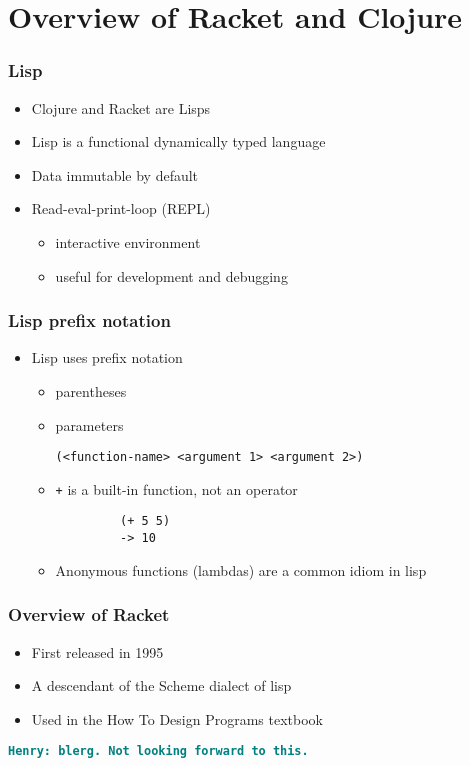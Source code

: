 \documentclass{beamer}
\newcommand{\comment}[1]{{\bf \tt  {#1}}}
\newcommand{\hfcomment}[1]{\textcolor{Teal}{\comment{Henry: {#1}}}}
\begin{document}
\section{Overview of Racket and Clojure}

\begin{frame}
\frametitle{Lisp}
	\begin{itemize}
		\item Clojure and Racket are Lisps
		\item Lisp is a functional dynamically typed language
		\item Data immutable by default
  			\item Read-eval-print-loop (REPL)
  	 		\begin{itemize}
  	 		\item interactive environment
  	 		\item useful for development and debugging
  	 	\end{itemize}
	\end{itemize}
\end{frame}

\begin{frame}[fragile]
\frametitle{Lisp prefix notation}
	\begin{itemize}
  	  \item Lisp uses prefix notation
  	  \begin{itemize}
  	 	 \item parentheses
  	 	 \item parameters
  	 	 
  	 	 \texttt{(<function-name> <argument 1> <argument 2>)}
  	 	 \item \texttt{+} is a built-in function, not an operator
  	 	 \begin{verbatim}		
		 (+ 5 5)
		 -> 10
	     \end{verbatim}
		\item Anonymous functions (lambdas) are a common idiom in lisp
		
	  \end{itemize}
   \end{itemize}
\end{frame}

\begin{frame}
\frametitle{Overview of Racket}
	\begin{itemize}
		\item First released in 1995
		\item A descendant of the Scheme dialect of lisp
		\item Used in the How To Design Programs textbook
	\end{itemize}
\hfcomment{blerg. Not looking forward to this.}
\end{frame}
\end{document}
